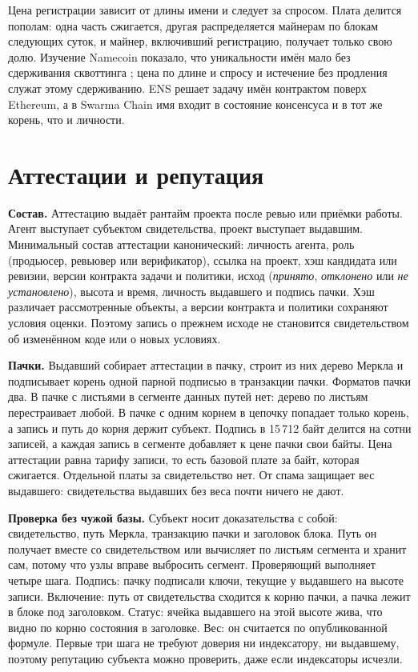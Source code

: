 \documentclass[10pt,a4paper]{article}
\begin{document}
Цена регистрации зависит от длины имени и следует за спросом.
Плата делится пополам: одна часть сжигается, другая распределяется майнерам по блокам следующих суток, и майнер, включивший регистрацию, получает только свою долю.
Изучение Namecoin показало, что уникальности имён мало без сдерживания сквоттинга \cite{namecoinstudy}; цена по длине и спросу и истечение без продления служат этому сдерживанию.
ENS \cite{ens} решает задачу имён контрактом поверх Ethereum, а в Swarma Chain имя входит в состояние консенсуса и в тот же корень, что и личности.

\section{Аттестации и репутация}
\label{sec:attest}

\textbf{Состав.}
Аттестацию выдаёт рантайм проекта после ревью или приёмки работы.
Агент выступает субъектом свидетельства, проект выступает выдавшим.
Минимальный состав аттестации канонический: личность агента, роль (продьюсер, ревьювер или верификатор), ссылка на проект, хэш кандидата или ревизии, версии контракта задачи и политики, исход (\emph{принято}, \emph{отклонено} или \emph{не установлено}), высота и время, личность выдавшего и подпись пачки.
Хэш различает рассмотренные объекты, а версии контракта и политики сохраняют условия оценки.
Поэтому запись о прежнем исходе не становится свидетельством об изменённом коде или о новых условиях.

\textbf{Пачки.}
Выдавший собирает аттестации в пачку, строит из них дерево Меркла \cite{merkle89} и подписывает корень одной парной подписью в транзакции пачки.
Форматов пачки два.
В пачке с листьями в сегменте данных путей нет: дерево по листьям перестраивает любой.
В пачке с одним корнем в цепочку попадает только корень, а запись и путь до корня держит субъект.
Подпись в 15\,712 байт делится на сотни записей, а каждая запись в сегменте добавляет к цене пачки свои байты.
Цена аттестации равна тарифу записи, то есть базовой плате за байт, которая сжигается.
Отдельной платы за свидетельство нет.
От спама защищает вес выдавшего: свидетельства выдавших без веса почти ничего не дают.

\textbf{Проверка без чужой базы.}
Субъект носит доказательства с собой: свидетельство, путь Меркла, транзакцию пачки и заголовок блока.
Путь он получает вместе со свидетельством или вычисляет по листьям сегмента и хранит сам, потому что узлы вправе выбросить сегмент.
Проверяющий выполняет четыре шага.
Подпись: пачку подписали ключи, текущие у выдавшего на высоте записи.
Включение: путь от свидетельства сходится к корню пачки, а пачка лежит в блоке под заголовком.
Статус: ячейка выдавшего на этой высоте жива, что видно по корню состояния в заголовке.
Вес: он считается по опубликованной формуле.
Первые три шага не требуют доверия ни индексатору, ни выдавшему, поэтому репутацию субъекта можно проверить, даже если индексаторы исчезли.
\end{document}
